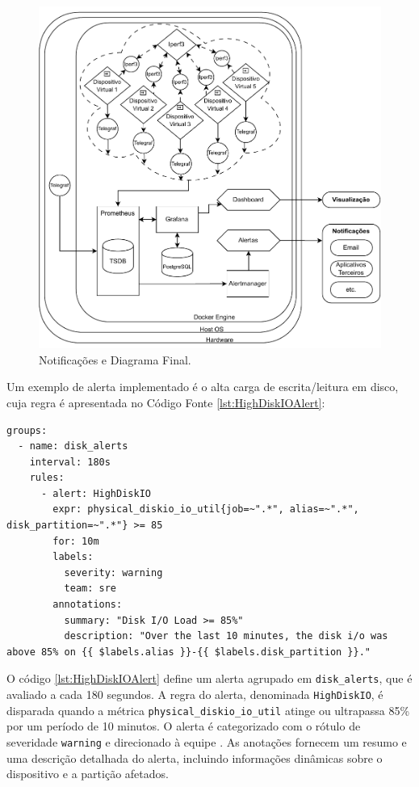 {\begin{figure}[H]
\centering
\setlength{\abovecaptionskip}{-20pt}
\includegraphics[width=\textwidth]{Imagens/chap04/by-blocks/alerts_diagram.pdf}
\caption{Notificações e Diagrama Final.}
\label{fig:DiagramaAlertas}
\end{figure}

Um exemplo de alerta implementado é o alta carga de escrita/leitura em disco, cuja regra é apresentada no Código Fonte \ref{lst:HighDiskIOAlert}:

\newpage

\begin{lstlisting}[caption={Alerta para alta carga de escrita/leitura em disco}, label={lst:HighDiskIOAlert}]
groups:
  - name: disk_alerts
    interval: 180s
    rules:
      - alert: HighDiskIO
        expr: physical_diskio_io_util{job=~".*", alias=~".*", disk_partition=~".*"} >= 85
        for: 10m
        labels:
          severity: warning
          team: sre
        annotations:
          summary: "Disk I/O Load >= 85%"
          description: "Over the last 10 minutes, the disk i/o was above 85% on {{ $labels.alias }}-{{ $labels.disk_partition }}."
\end{lstlisting}

O código \ref{lst:HighDiskIOAlert} define um alerta agrupado em \verb|disk_alerts|, que é avaliado a cada 180 segundos. A regra do alerta, denominada \verb|HighDiskIO|, é disparada quando a métrica \verb|physical_diskio_io_util| atinge ou ultrapassa 85\% por um período de 10 minutos. O alerta é categorizado com o rótulo de severidade \verb|warning| e direcionado à equipe . As anotações fornecem um resumo e uma descrição detalhada do alerta, incluindo informações dinâmicas sobre o dispositivo e a partição afetados.

}
